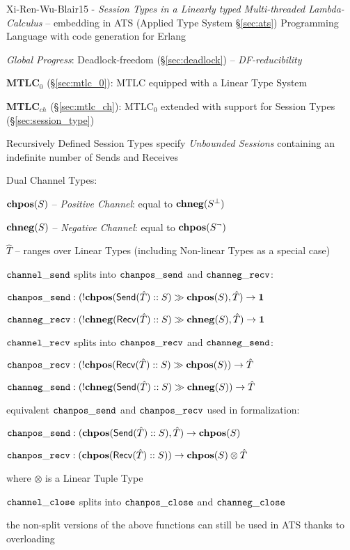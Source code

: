 Xi-Ren-Wu-Blair15 - \emph{Session Types in a Linearly typed
  Multi-threaded Lambda-Calculus} -- embedding in ATS (Applied Type
System \S\ref{sec:ats}) Programming Language with code generation for
Erlang

\emph{Global Progress}: Deadlock-freedom (\S\ref{sec:deadlock}) --
\emph{DF-reducibility}

\fist \textbf{MTLC$_0$} (\S\ref{sec:mtlc_0}): MTLC equipped with a
Linear Type System

\fist \textbf{MTLC$_{ch}$} (\S\ref{sec:mtlc_ch}): MTLC$_0$ extended
with support for Session Types (\S\ref{sec:session_type})

Recursively Defined Session Types specify \emph{Unbounded Sessions}
containing an indefinite number of Sends and Receives


Dual Channel Types:

$\mathbf{chpos}(S)$ -- \emph{Positive Channel}: equal to $\mathbf{chneg}(S^\bot)$

$\mathbf{chneg}(S)$ -- \emph{Negative Channel}: equal to $\mathbf{chpos}(S^\neg)$

$\hat{T}$ -- ranges over Linear Types (including Non-linear Types as a
special case)

$\mathtt{channel\_send}$ splits into $\mathtt{chanpos\_send}$ and $\mathtt{channeg\_recv}$:

$\mathtt{chanpos\_send} : (!\mathbf{chpos}(\mathsf{Send}(\hat{T})::S) \gg \mathbf{chpos}(S), \hat{T})
\rightarrow \mathsf{\mathbf{1}}$

$\mathtt{channeg\_recv} : (!\mathbf{chneg}(\mathsf{Recv}(\hat{T})::S) \gg \mathbf{chneg}(S), \hat{T})
\rightarrow \mathsf{\mathbf{1}}$

$\mathtt{channel\_recv}$ splits into $\mathtt{chanpos\_recv}$ and $\mathtt{channeg\_send}$:

$\mathtt{chanpos\_recv} : (!\mathbf{chpos}(\mathsf{Recv}(\hat{T})::S) \gg \mathbf{chpos}(S))
\rightarrow \hat{T}$

$\mathtt{channeg\_send} : (!\mathbf{chneg}(\mathsf{Send}(\hat{T})::S) \gg \mathbf{chneg}(S))
\rightarrow \hat{T}$

equivalent $\mathtt{chanpos\_send}$ and $\mathtt{chanpos\_recv}$ used in formalization:

$\mathtt{chanpos\_send} : (\mathbf{chpos}(\mathsf{Send}(\hat{T})::S), \hat{T}) \rightarrow \mathbf{chpos}(S)$

$\mathtt{chanpos\_recv} : (\mathbf{chpos}(\mathsf{Recv}(\hat{T})::S)) \rightarrow \mathbf{chpos}(S)
\otimes \hat{T}$

where $\otimes$ is a Linear Tuple Type

$\mathtt{channel\_close}$ splits into $\mathtt{chanpos\_close}$ and $\mathtt{channeg\_close}$

the non-split versions of the above functions can still be used in ATS
thanks to overloading

